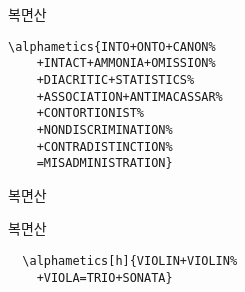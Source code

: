 \documentclass{beamer}
\begin{document}
%
\begin{frame}[fragile]{복면산}
  \Large
  \begin{Verbatim}[baselinestretch=1]
  \alphametics{INTO+ONTO+CANON%
    +INTACT+AMMONIA+OMISSION%
    +DIACRITIC+STATISTICS%
    +ASSOCIATION+ANTIMACASSAR%
    +CONTORTIONIST%
    +NONDISCRIMINATION%
    +CONTRADISTINCTION%
    =MISADMINISTRATION}
\end{Verbatim}
\end{frame}

%
\begin{frame}{복면산}
  \Large
\end{frame}

%
\begin{frame}[fragile]{복면산}
  \Large
\begin{verbatim}
  \alphametics[h]{VIOLIN+VIOLIN%
    +VIOLA=TRIO+SONATA}
\end{verbatim}
\end{frame}

%
\end{document}
